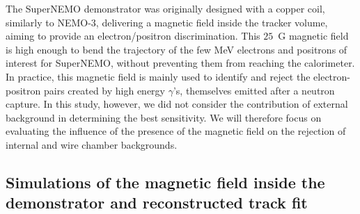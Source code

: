 The SuperNEMO demonstrator was originally designed with a copper coil, similarly to NEMO-$3$, delivering a magnetic field inside the tracker volume, aiming to provide an electron/positron discrimination.
This $25$~G magnetic field is high enough to bend the trajectory of the few MeV electrons and positrons of interest for SuperNEMO, without preventing them from reaching the calorimeter.
In practice, this magnetic field is mainly used to identify and reject the electron-positron pairs created by high energy $\gamma$’s, themselves emitted after a neutron capture.
In this study, however, we did not consider the contribution of external background in determining the best sensitivity.
We will therefore focus on evaluating the influence of the presence of the magnetic field on the rejection of internal and wire chamber backgrounds.





\subsection{Simulations of the magnetic field inside the demonstrator and reconstructed track fit}


